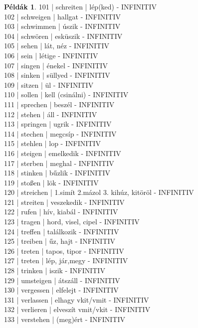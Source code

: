 \documentclass{article}
\theoremstyle{definition}
\newtheorem*{exmp}{Példák}
\begin{document}
\begin{exmp}
101 | schreiten | lép(ked) - INFINITIV\\
102 | schweigen | hallgat - INFINITIV\\
103 | schwimmen | úszik - INFINITIV\\
104 | schwören | esküszik - INFINITIV\\
105 | sehen | lát, néz - INFINITIV\\
106 | sein | létige - INFINITIV\\
107 | singen | énekel - INFINITIV\\
108 | sinken | süllyed - INFINITIV\\
109 | sitzen | ül - INFINITIV\\
110 | sollen | kell (csinálni) - INFINITIV\\
111 | sprechen | beszél - INFINITIV\\
112 | stehen | áll - INFINITIV\\
113 | springen | ugrik - INFINITIV\\
114 | stechen | megcsíp - INFINITIV\\
115 | stehlen | lop - INFINITIV\\
116 | steigen | emelkedik - INFINITIV\\
117 | sterben | meghal - INFINITIV\\
118 | stinken | bűzlik - INFINITIV\\
119 | stoßen | lök - INFINITIV\\
120 | streichen | 1.simít 2.mázol 3. kihúz, kitöröl - INFINITIV\\
121 | streiten | veszekedik - INFINITIV\\
122 | rufen | hív, kiabál - INFINITIV\\
123 | tragen | hord, visel, cipel - INFINITIV\\
124 | treffen | találkozik - INFINITIV\\
125 | treiben | űz, hajt - INFINITIV\\
126 | treten | tapos, tipor - INFINITIV\\
127 | treten | lép, jár,megy - INFINITIV\\
128 | trinken | iszik - INFINITIV\\
129 | umsteigen | átszáll - INFINITIV\\
130 | vergessen | elfelejt - INFINITIV\\
131 | verlassen | elhagy vkit/vmit - INFINITIV\\
132 | verlieren | elveszít vmit/vkit - INFINITIV\\
133 | verstehen | (meg)ért - INFINITIV\\

\end{exmp}
\end{document}
